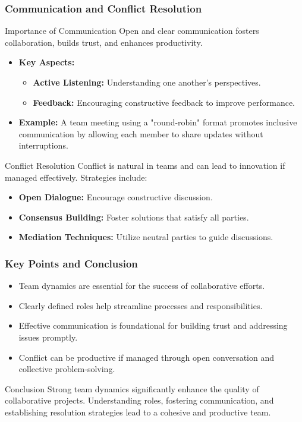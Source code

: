 \documentclass[aspectratio=169]{beamer}
\begin{document}
\begin{frame}[fragile]
    \frametitle{Communication and Conflict Resolution}
    \begin{block}{Importance of Communication}
        Open and clear communication fosters collaboration, builds trust, and enhances productivity.
    \end{block}
    \begin{itemize}
        \item \textbf{Key Aspects:}
        \begin{itemize}
            \item \textbf{Active Listening:} Understanding one another's perspectives.
            \item \textbf{Feedback:} Encouraging constructive feedback to improve performance.
        \end{itemize}
        \item \textbf{Example:} A team meeting using a "round-robin" format promotes inclusive communication by allowing each member to share updates without interruptions.
    \end{itemize}
    
    \begin{block}{Conflict Resolution}
        Conflict is natural in teams and can lead to innovation if managed effectively. Strategies include:
        \begin{itemize}
            \item \textbf{Open Dialogue:} Encourage constructive discussion.
            \item \textbf{Consensus Building:} Foster solutions that satisfy all parties.
            \item \textbf{Mediation Techniques:} Utilize neutral parties to guide discussions.
        \end{itemize}
    \end{block}
\end{frame}

\begin{frame}[fragile]
    \frametitle{Key Points and Conclusion}
    \begin{itemize}
        \item Team dynamics are essential for the success of collaborative efforts.
        \item Clearly defined roles help streamline processes and responsibilities.
        \item Effective communication is foundational for building trust and addressing issues promptly.
        \item Conflict can be productive if managed through open conversation and collective problem-solving.
    \end{itemize}
    \begin{block}{Conclusion}
        Strong team dynamics significantly enhance the quality of collaborative projects. Understanding roles, fostering communication, and establishing resolution strategies lead to a cohesive and productive team.
    \end{block}
\end{frame}
\end{document}
